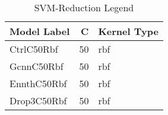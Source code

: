 \begin{table}
\centering
\caption{SVM-Reduction Legend}
\label{tab:SVM-Reduction_legend}
\begin{tabular}{lrl}
\toprule
Model Label & C & Kernel Type \\
\midrule
CtrlC50Rbf & 50 & rbf \\
GcnnC50Rbf & 50 & rbf \\
EnnthC50Rbf & 50 & rbf \\
Drop3C50Rbf & 50 & rbf \\
\bottomrule
\end{tabular}
\end{table}
